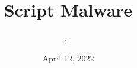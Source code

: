 \documentclass{../../../extra/styles/SecureRole}
\title{Script Malware}
\author{\Ba, \Wi, \Zm}
\date{April 12, 2022}
\begin{document}
\makecover
\newpage

\tableofcontents
\newpage






%
% 

\printglossaries
\end{document}
